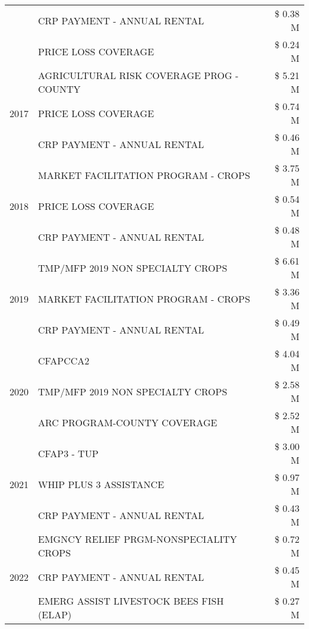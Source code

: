 \begin{tabular}{llr}
 & CRP PAYMENT - ANNUAL RENTAL & \$ 0.38 M \\
 & PRICE LOSS COVERAGE & \$ 0.24 M \\
\cline{1-3}
\multirow[t]{3}{*}{2017} & AGRICULTURAL RISK COVERAGE PROG - COUNTY & \$ 5.21 M \\
 & PRICE LOSS COVERAGE & \$ 0.74 M \\
 & CRP PAYMENT - ANNUAL RENTAL & \$ 0.46 M \\
\cline{1-3}
\multirow[t]{3}{*}{2018} & MARKET FACILITATION PROGRAM - CROPS & \$ 3.75 M \\
 & PRICE LOSS COVERAGE & \$ 0.54 M \\
 & CRP PAYMENT - ANNUAL RENTAL & \$ 0.48 M \\
\cline{1-3}
\multirow[t]{3}{*}{2019} & TMP/MFP 2019 NON SPECIALTY CROPS & \$ 6.61 M \\
 & MARKET FACILITATION PROGRAM - CROPS & \$ 3.36 M \\
 & CRP PAYMENT - ANNUAL RENTAL & \$ 0.49 M \\
\cline{1-3}
\multirow[t]{3}{*}{2020} & CFAPCCA2 & \$ 4.04 M \\
 & TMP/MFP 2019 NON SPECIALTY CROPS & \$ 2.58 M \\
 & ARC PROGRAM-COUNTY COVERAGE & \$ 2.52 M \\
\cline{1-3}
\multirow[t]{3}{*}{2021} & CFAP3 - TUP & \$ 3.00 M \\
 & WHIP PLUS 3 ASSISTANCE & \$ 0.97 M \\
 & CRP PAYMENT - ANNUAL RENTAL & \$ 0.43 M \\
\cline{1-3}
\multirow[t]{3}{*}{2022} & EMGNCY RELIEF PRGM-NONSPECIALITY CROPS & \$ 0.72 M \\
 & CRP PAYMENT - ANNUAL RENTAL & \$ 0.45 M \\
 & EMERG ASSIST LIVESTOCK BEES FISH (ELAP) & \$ 0.27 M \\
\cline{1-3}
\bottomrule
\end{tabular}
